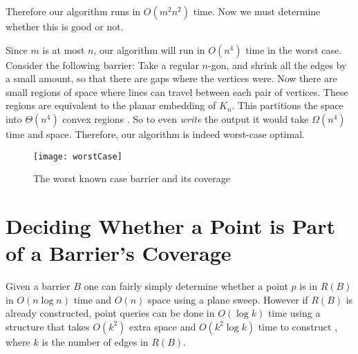 \documentclass{cccg12}
\begin{document}
Therefore our algorithm runs in $O(m^2n^2)$ time. Now we must determine whether this is good or not.

Since $m$ is at most $n$, our algorithm will run in $O(n^4)$ time in the worst case. Consider the following barrier: Take a regular $n$-gon, and shrink all the edges by a small amount, so that there are gaps where the vertices were. Now there are small regions of space where lines can travel between  each pair of vertices. These regions are equivalent to the planar embedding of $K_n$. This partitions the space into $\Theta(n^4)$ convex regions \cite{Freeman76}. So to even \emph{write} the output it would take $\Omega(n^4)$ time and space. Therefore, our algorithm is indeed worst-case optimal.


\begin{figure}[ht]
  \centering
  \texttt{[image: worstCase]}
  \caption{The worst known case barrier and its coverage}
  \label{fig:worstCase}
\end{figure}

\section{Deciding Whether a Point is Part of a Barrier's Coverage}

Given a barrier $B$ one can fairly simply determine whether a point $p$ is in $R(B)$ in $O(n\log n)$ time and $O(n)$ space using a plane sweep. However if $R(B)$ is already constructed, point queries can be done in $O(\log k)$ time using a structure that takes $O(k^2)$ extra space and $O(k^2 \log k)$ time to construct \cite{Kirkpatrick83}, where $k$ is the number of edges in $R(B)$.

\small 


\end{document}
